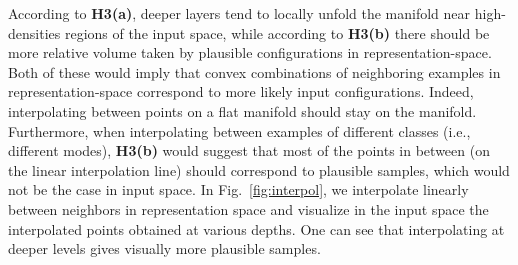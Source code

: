 According to {\bf H3(a)}, deeper layers tend to locally unfold the manifold
near high-densities regions of the input space, while according to {\bf H3(b)}
there should be more relative volume taken by plausible configurations in representation-space.
Both of these would imply that convex combinations of neighboring examples in representation-space
correspond to more likely input configurations. Indeed, interpolating between
points on a flat manifold should stay on the manifold. Furthermore, when interpolating
between examples of different classes (i.e., different modes), {\bf H3(b)} would
suggest that most of the points in between (on the linear interpolation line)
should correspond to plausible samples, which would not be the case in input space.
In Fig.~\ref{fig:interpol}, we interpolate linearly between neighbors in
representation space and visualize in the input space the interpolated points obtained at
various depths. One can see that interpolating at deeper levels gives visually
more plausible samples.


